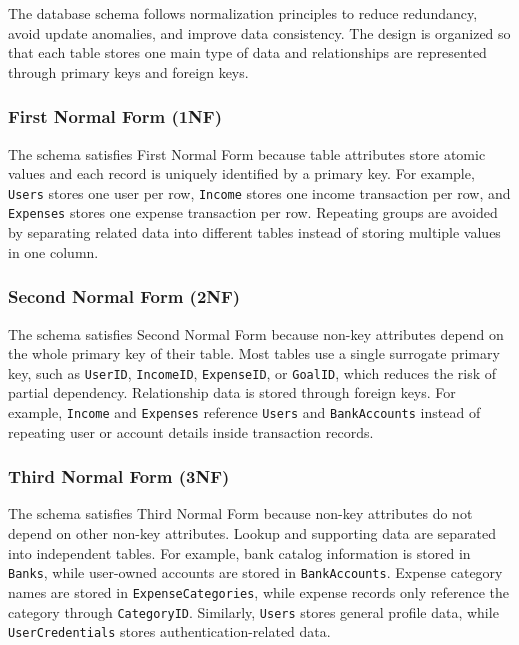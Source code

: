 \documentclass{article}
\begin{document}
The database schema follows normalization principles to reduce redundancy, avoid update anomalies, and improve data consistency. The design is organized so that each table stores one main type of data and relationships are represented through primary keys and foreign keys.

\subsubsection{First Normal Form (1NF)}

The schema satisfies First Normal Form because table attributes store atomic values and each record is uniquely identified by a primary key. For example, \texttt{Users} stores one user per row, \texttt{Income} stores one income transaction per row, and \texttt{Expenses} stores one expense transaction per row. Repeating groups are avoided by separating related data into different tables instead of storing multiple values in one column.

\subsubsection{Second Normal Form (2NF)}

The schema satisfies Second Normal Form because non-key attributes depend on the whole primary key of their table. Most tables use a single surrogate primary key, such as \texttt{UserID}, \texttt{IncomeID}, \texttt{ExpenseID}, or \texttt{GoalID}, which reduces the risk of partial dependency. Relationship data is stored through foreign keys. For example, \texttt{Income} and \texttt{Expenses} reference \texttt{Users} and \texttt{BankAccounts} instead of repeating user or account details inside transaction records.

\subsubsection{Third Normal Form (3NF)}

The schema satisfies Third Normal Form because non-key attributes do not depend on other non-key attributes. Lookup and supporting data are separated into independent tables. For example, bank catalog information is stored in \texttt{Banks}, while user-owned accounts are stored in \texttt{BankAccounts}. Expense category names are stored in \texttt{ExpenseCategories}, while expense records only reference the category through \texttt{CategoryID}. Similarly, \texttt{Users} stores general profile data, while \texttt{UserCredentials} stores authentication-related data.
\end{document}
